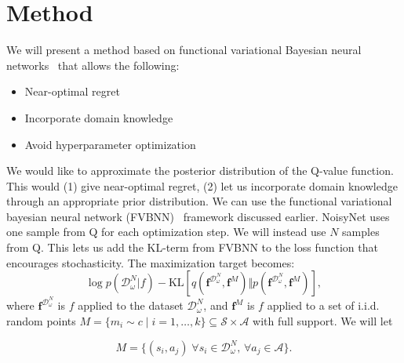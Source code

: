\documentclass[]{uai2021} %
\newcommand{\D}{\mathcal{D}}
\newcommand{\f}{\mathbf{f}}
\newcommand{\state}{\mathcal{S}}
\newcommand{\action}{\mathcal{A}}
\newcommand{\KL}{\mathrm{KL}}
\begin{document}
\section{Method}
We will present a method based on functional variational Bayesian neural
networks~\citep{sun_functional_2019} that allows the following:

\begin{itemize}
    \item Near-optimal regret
    \item Incorporate domain knowledge
    \item Avoid hyperparameter optimization
\end{itemize}


We would like to approximate the posterior distribution of the Q-value function.
This would (1) give near-optimal regret, (2) let us incorporate domain knowledge
through an appropriate prior distribution.
We can use the functional variational bayesian neural
network (FVBNN)~\citep{sun_functional_2019} framework discussed earlier.
NoisyNet uses one sample from Q for each optimization step. We will instead use
\(N\) samples
from Q. This lets us add the KL-term from FVBNN to the loss function that
encourages stochasticity.
The maximization target becomes:
\begin{equation}
    \log p(\D_\omega^N \vert f) - \KL \left[ q(\f^{\D_\omega^N}, \f^M) \Vert p(\f^{\D_\omega^N}, \f^M) \right],
\end{equation}
where \(\f^{\D_\omega^N}\) is \(f\) applied to the dataset \(\D_\omega^N\), and \(\f^M\) is \(f\) applied to
a set of i.i.d. random points \(M = \{m_i \sim c \mid i=1,\dots,k\} \subseteq \state \times \action\)
with full support. We will let

\begin{equation}
    M = \{(s_i, a_j) \; \forall s_i \in \D_\omega^N,\, \forall a_j \in \action\}. 
\end{equation}
\end{document}
